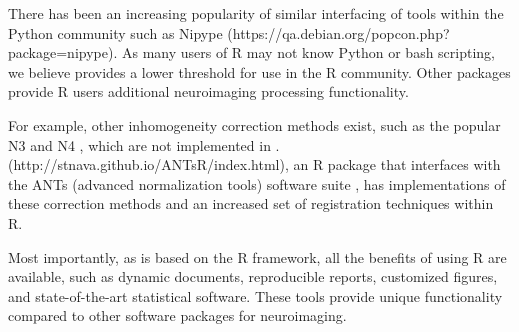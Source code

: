 \documentclass[a4paper]{report}\usepackage[]{graphicx}\usepackage[]{color}
\let\pkg=\strong
\begin{document}
\begin{article}
There has been an increasing popularity of similar interfacing of tools within the Python community such as Nipype \citep{gorgolewski_nipype:_2011} (https://qa.debian.org/popcon.php?package=nipype).  As many users of R may not know Python or bash scripting, we believe \pkg{fslr} provides a lower threshold for use in the R community.  Other packages provide R users additional neuroimaging processing functionality.   

For example, other inhomogeneity correction methods exist, such as the popular N3 \citep{sled_nonparametric_1998} and N4 \citep{tustison_n4itk:_2010}, which are not implemented in \pkg{fslr}. \pkg{ANTsR} (http://stnava.github.io/ANTsR/index.html), an R package that interfaces with the ANTs (advanced normalization tools) software suite \citep{avants_reproducible_2011}, has implementations of these correction methods and an increased set of registration techniques within R.


Most importantly, as \pkg{fslr} is based on the R framework, all the benefits of using R are available, such as dynamic documents, reproducible reports, customized figures, and state-of-the-art statistical software.  These tools provide unique functionality compared to other software packages for neuroimaging.  


%








\end{article}
\end{document}
